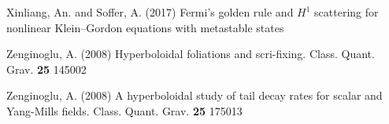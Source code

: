 \begin{thebibliography}{}
 Xinliang, An. and Soffer, A. (2017)
Fermi's golden rule and $H^1$ scattering for nonlinear Klein--Gordon equations with metastable states

 Zenginoglu, A. (2008)
Hyperboloidal foliations and scri-fixing. Class. Quant. Grav. {\bf 25} 145002

 Zenginoglu, A. (2008)
A hyperboloidal study of tail decay rates for scalar and Yang-Mills fields. Class. Quant. Grav. {\bf 25} 175013





\end{thebibliography}